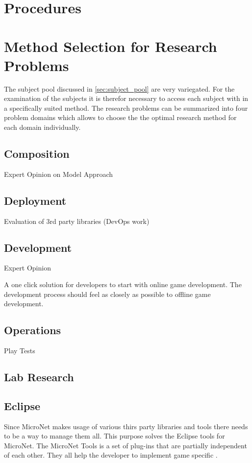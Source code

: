 \section{Procedures}

\section{Method Selection for Research Problems}

The subject pool discussed in \autoref{sec:subject_pool} are very variegated.
For the examination of the subjects it is therefor necessary to access each
subject with in a specifically suited method. The research problems can be
summarized into four problem domains which allows to choose the the optimal
research method for each domain individually.

\subsection{Composition}
Expert Opinion on Model Approach

\subsection{Deployment}
Evaluation of 3rd party libraries (DevOps work)


\subsection{Development}
Expert Opinion

A one click solution for developers to start with online game
  	  development. The development process should feel as closely as possible to
  	  offline game development.

\subsection{Operations}
Play Tests

\subsection{Lab Research}
\label{sub:lab_reserach}

\subsection{Eclipse}

Since MicroNet makes usage of various thirs party libraries and tools there
needs to be a way to manage them all. This purpose solves the Eclipse tools for
MicroNet. The MicroNet Tools is a set of plug-ins that are partially independent
of each other. They all help the developer to implement game specific \mss{}.

